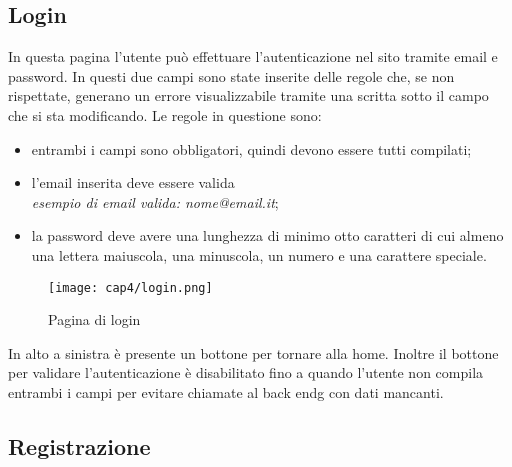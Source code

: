 \subsection{Login}
\label{subsec:login}

In questa pagina l'utente può effettuare l'autenticazione nel sito tramite email e password. In questi due campi sono state inserite delle regole che, se non rispettate, generano un errore visualizzabile tramite una scritta sotto il campo che si sta modificando. Le regole in questione sono:
\begin{itemize}
	\item entrambi i campi sono obbligatori, quindi devono essere tutti compilati;
	\item l'email inserita deve essere valida\\
	\textit{esempio di email valida: nome@email.it};
	\item la password deve avere una lunghezza di minimo otto caratteri di cui almeno una lettera maiuscola, una minuscola, un numero e una carattere speciale.
\end{itemize}
\begin{figure}[H]
	\begin{center}
		\texttt{[image: cap4/login.png]}
		\caption{Pagina di login}
	\end{center}
\end{figure}
In alto a sinistra è presente un bottone per tornare alla home. Inoltre il bottone per validare l'autenticazione è disabilitato fino a quando l'utente non compila entrambi i campi per evitare chiamate al \gls{back endg} con dati mancanti.

\subsection{Registrazione}
\label{subsec:registrazione}

